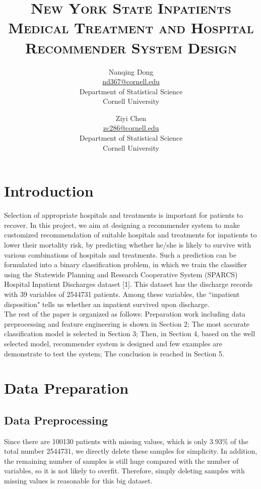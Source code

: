 \documentclass{article}
\title{\huge \scshape New York State Inpatients Medical Treatment and Hospital Recommender System Design}
\author{Nanqing Dong \\ \href{mailto:nd367@cornell.edu}{nd367@cornell.edu} \\ Department of Statistical Science \\ Cornell University
\and Ziyi Chen \\  \href{mailto:zc286@cornell.edu}{zc286@cornell.edu} \\ Department of Statistical Science \\ Cornell University}
\date{}
\begin{document}
\maketitle

\section{Introduction}
\indent
Selection of appropriate hospitals and treatments is important for patients to recover. In this project, we aim at designing a recommender system to make customized recommendation of suitable hospitals and treatments for inpatients to lower their mortality risk, by predicting whether he/she is likely to survive with various combinations of hospitals and treatments. Such a prediction can be formulated into a binary classification problem, in which we train the classifier using the Statewide Planning and Research Cooperative System (SPARCS) Hospital Inpatient Discharges dataset [1]. This dataset has the discharge records with 39 variables of 2544731 patients. Among these variables, the ``inpatient disposition" tells us whether an inpatient survived upon discharge. \\%

The rest of the paper is organized as follows: Preparation work including data preprocessing and feature engineering is shown in Section 2; The most accurate classification model is selected in Section 3; Then, in Section 4, based on the well selected model, recommender system is designed and few examples are demonstrate to test the system; The conclusion is reached in Section 5.

\section{Data Preparation}
\subsection{Data Preprocessing}
Since there are 100130 patients with missing values, which is only 3.93\% of the total number 2544731, we directly delete these samples for simplicity. In addition, the remaining number of samples is still huge compared with the number of variables, so it is not likely to overfit. Therefore, simply deleting samples with missing values is reasonable for this big dataset.\\
\end{document}
